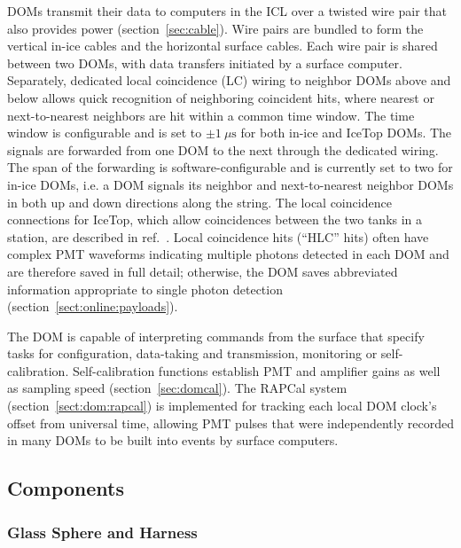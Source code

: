 DOMs transmit their data to computers in the ICL
over a twisted wire pair that also provides power (section~\ref{sec:cable}).
Wire pairs are bundled to form the vertical in-ice cables and the horizontal surface
cables.  Each wire pair is shared between two DOMs, with data transfers
initiated by a surface computer.  Separately, dedicated local coincidence
(LC) wiring to neighbor DOMs above and below allows quick recognition of neighboring
coincident hits, where
nearest or next-to-nearest neighbors are hit within a common time
window. The time window is configurable and is set to $\pm1~\mu\mathrm{s}$
for both in-ice and IceTop DOMs. The signals are forwarded from one DOM to the next
through the dedicated wiring.  The span of the forwarding is
software-configurable and is currently set to two for in-ice DOMs,
i.e. a DOM signals its neighbor and next-to-nearest neighbor DOMs in
both up and down directions along the string. The local coincidence
connections for IceTop, which allow coincidences between the two tanks in a
station, are described in ref.~\cite{ICECUBE:IceTop}. Local coincidence
hits (``HLC'' hits) often have complex PMT waveforms
indicating multiple photons detected in each DOM and are therefore saved
in full detail; otherwise, the DOM saves abbreviated information appropriate
to single photon detection (section~\ref{sect:online:payloads}).

The DOM is capable of interpreting commands from the surface that specify
tasks for configuration, data-taking and transmission, monitoring or
self-calibration.  Self-calibration functions establish PMT and amplifier
gains as well as sampling speed (section~\ref{sec:domcal}).  The RAPCal
system (section~\ref{sect:dom:rapcal}) is implemented for tracking each
local DOM clock's offset from universal time, allowing PMT pulses that were
independently recorded in many DOMs to be built into events by surface
computers.

\subsection{\label{sec:dom_components}Components}

\subsubsection{\label{sec:sphere}Glass Sphere and Harness}

